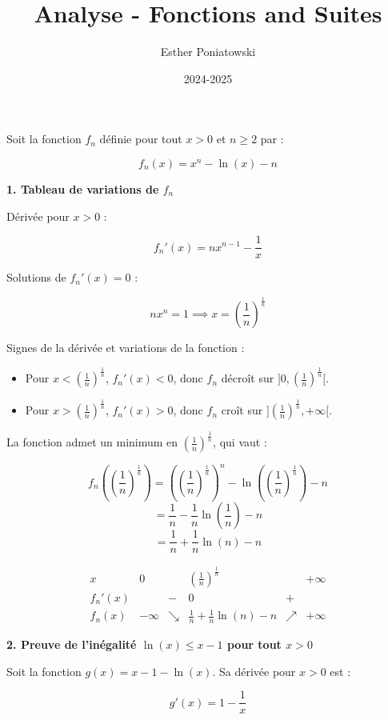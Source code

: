 \documentclass[10pt,a4paper]{article}
\title{Analyse - Fonctions and Suites}
\author{Esther Poniatowski}
\date{2024-2025}
\begin{document}
Soit la fonction \( f_n \) définie pour tout \( x > 0 \) et \( n \geq 2 \) par :

\[
    f_n(x) = x^n - \ln(x) - n
\]

\textbf{1. Tableau de variations de \( f_n \)}

Dérivée pour \( x > 0 \) :

\[
    f_n'(x) = n x^{n-1} - \frac{1}{x}
\]

Solutions de \( f_n'(x) = 0 \) :

\[
    n x^{n} = 1 \implies x = \left(\frac{1}{n}\right)^{\frac{1}{n}}
\]

Signes de la dérivée et variations de la fonction :

\begin{itemize}
    \item Pour \( x < \left(\frac{1}{n}\right)^{\frac{1}{n}} \), \( f_n'(x) < 0 \),
          donc \( f_n \) décroît sur \( ]0, \left(\frac{1}{n}\right)^{\frac{1}{n}}[ \).
    \item Pour \( x > \left(\frac{1}{n}\right)^{\frac{1}{n}} \), \( f_n'(x) > 0 \),
          donc \( f_n \) croît sur \( ]\left(\frac{1}{n}\right)^{\frac{1}{n}}, +\infty[ \).
\end{itemize}

La fonction admet un minimum en \( \left(\frac{1}{n}\right)^{\frac{1}{n}} \), qui vaut :

\[
    f_n\left(\left(\frac{1}{n}\right)^{\frac{1}{n}}\right) = \left(\left(\frac{1}{n}\right)^{\frac{1}{n}}\right)^{n} - \ln\left(\left(\frac{1}{n}\right)^{\frac{1}{n}}\right) - n
\]
\[
    = \frac{1}{n} - \frac{1}{n} \ln\left(\frac{1}{n}\right) - n
\]
\[
    = \frac{1}{n} + \frac{1}{n} \ln(n) - n
\]

\[
\begin{array}{c|ccccc}
x & 0 &  & \left(\frac{1}{n}\right)^{\frac{1}{n}} &  & +\infty \\
\hline
f_n'(x) &  & - & 0 & + &  \\
\hline
f_n(x) & -\infty & \searrow & \frac{1}{n} + \frac{1}{n} \ln(n) - n & \nearrow & +\infty
\end{array}
\]

\bigskip
\textbf{2. Preuve de l'inégalité \( \ln(x) \leq x - 1 \) pour tout \( x > 0 \)}

Soit la fonction \( g(x) = x - 1 - \ln(x) \). Sa dérivée pour \( x > 0 \) est :

\[
    g'(x) = 1 - \frac{1}{x}
\]
\end{document}
